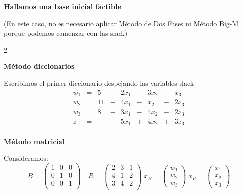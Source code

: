 \documentclass{article}
\begin{document}
    \begin{center}
        \textbf{Hallamos una base inicial factible}

        (En este caso, no es necesario aplicar Método de Dos Fases ni Método Big-M porque podemos comenzar con las slack)
    \end{center}
    \begin{multicols}{2}
        \raggedcolumns
        \begin{center}
            \textbf{Método diccionarios}
        \end{center}

        Escribimos el primer diccionario despejando las variables slack
        \[
            \begin{array}{rrrrrrrrr}

                w_1 & = & 5  & - & 2x_1 & - & 3x_2 & - & x_3  \\
                w_2 & = & 11 & - & 4x_1 & - & x_2  & - & 2x_3 \\
                w_3 & = & 8  & - & 3x_1 & - & 4x_2 & - & 2x_3 \\\hline
                z   & = &    &   & 5x_1 & + & 4x_2 & + & 3x_3 \\
            \end{array}
        \]
        \columnbreak

        \begin{center}
            \textbf{Método matricial}
        \end{center}

        Consideramos:
        \[
            B = \begin{pmatrix}
                    1 & 0 & 0 \\
                    0 & 1 & 0 \\
                    0 & 0 & 1 \\
            \end{pmatrix} \quad
            R = \begin{pmatrix}
                    2 & 3 & 1 \\
                    4 & 1 & 2 \\
                    3 & 4 & 2 \\
            \end{pmatrix} \;
            x_B = \begin{pmatrix}
                      w_1 \\
                      w_2 \\
                      w_3
            \end{pmatrix} \;
            x_R = \begin{pmatrix}
                      x_1 \\
                      x_2 \\
                      x_3
            \end{pmatrix}
        \]
    \end{multicols}
\end{document}
